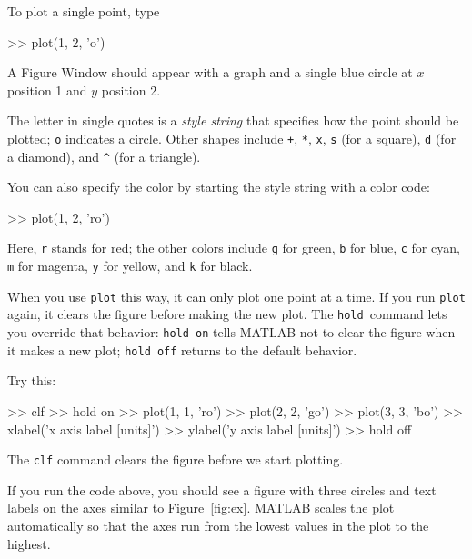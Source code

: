 To plot a single point, type

\begin{code}
>> plot(1, 2, 'o')
\end{code}

A Figure Window should appear with a graph and a single blue circle at $x$ position 1 and $y$ position 2.


The letter in single quotes is a \emph{style string} that specifies how the
point should be plotted;  \lstinline{o} indicates a circle.
Other shapes include \lstinline{+},
\lstinline{*},
\lstinline{x},
\lstinline{s} (for a square),
\lstinline{d} (for a diamond), and
\lstinline{^} (for a triangle).

You can also specify the color by starting the style string with a color code:

\begin{code}
>> plot(1, 2, 'ro')
\end{code}

Here, \lstinline{r} stands for red; the other colors include \lstinline{g} for green, \lstinline{b} for blue, \lstinline{c} for cyan, \lstinline{m} for magenta, \lstinline{y} for yellow, and \lstinline{k} for black.

When you use \lstinline{plot} this way, it can only plot one point at a
time.  If you run \lstinline{plot} again, it clears the figure before making
the new plot.  The \lstinline{hold}~command lets you override that behavior:
\lstinline{hold on} tells MATLAB not to clear the figure when it makes a new
plot; \lstinline{hold off} returns to the default behavior.


Try this:

\begin{code}
>> clf
>> hold on
>> plot(1, 1, 'ro')
>> plot(2, 2, 'go')
>> plot(3, 3, 'bo')
>> xlabel('x axis label [units]')
>> ylabel('y axis label [units]')
>> hold off
\end{code}

The \lstinline{clf} command clears the figure before we start plotting.


If you run the code above, you should see a figure with three circles and text labels on the axes similar to Figure~\ref{fig:ex}.  MATLAB scales the plot automatically so that the axes run from the lowest values in the plot to the highest.

